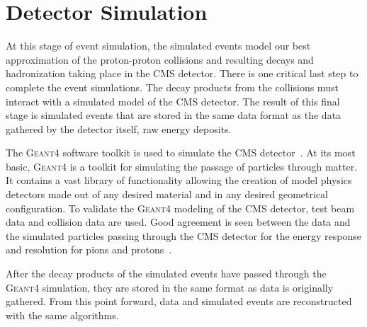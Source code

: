 \section{Detector Simulation}
At this stage of event simulation, the simulated events model our best approximation
of the proton-proton collisions and resulting decays and hadronization taking place
in the CMS detector. There is one critical last step to complete the event
simulations. The decay products from the collisions must interact with a simulated
model of the CMS detector. The result of this final stage is simulated events that
are stored in the same data format as the data gathered by the detector itself,
raw energy deposits.

The \textsc{Geant4} software toolkit is used to simulate the CMS 
detector~\cite{Agostinelli:2002hh}. At its most basic, \textsc{Geant4} is a 
toolkit for simulating the passage of particles through matter. It contains a 
vast library of functionality allowing the creation of model physics detectors
made out of any desired material and in any desired geometrical configuration.
To validate the \textsc{Geant4} modeling of the CMS detector, test beam data and
collision data are used. Good agreement is seen between the data and the
simulated particles passing through the CMS detector for the energy response
and resolution for pions and protons~\cite{geant4_cms_2017}.

After the decay products of the simulated events have passed through the \textsc{Geant4}
simulation, they are stored in the same format as data is originally gathered. From
this point forward, data and simulated events are reconstructed with the same 
algorithms.




